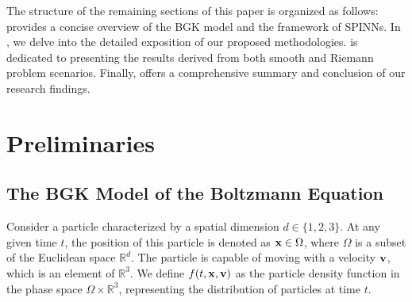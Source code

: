 \documentclass[preprint,12pt]{elsarticle}
\begin{document}
The structure of the remaining sections of this paper is organized as follows:  provides a concise overview of the BGK model and the framework of SPINNs. In , we delve into the detailed exposition of our proposed methodologies.   is dedicated to presenting the results derived from both smooth and Riemann problem scenarios. Finally,  offers a comprehensive summary and conclusion of our research findings.




\section{Preliminaries}\label{sec:preliminaries}
\subsection{The BGK Model of the Boltzmann Equation}
Consider a particle characterized by a spatial dimension $d \in \{1,2,3\}$.
At any given time $t$, the position of this particle is denoted as ${\bf x} \in \Omega$, where $\Omega$ is a subset of the Euclidean space $\mathbb{R}^d$.
The particle is capable of moving with a velocity ${\bf v}$, which is an element of $\mathbb{R}^3$. We define $f(t, {\bf x, v})$ as the particle density function in the phase space $\Omega \times \mathbb{R}^3$, representing the distribution of particles at time $t$.
\end{document}
